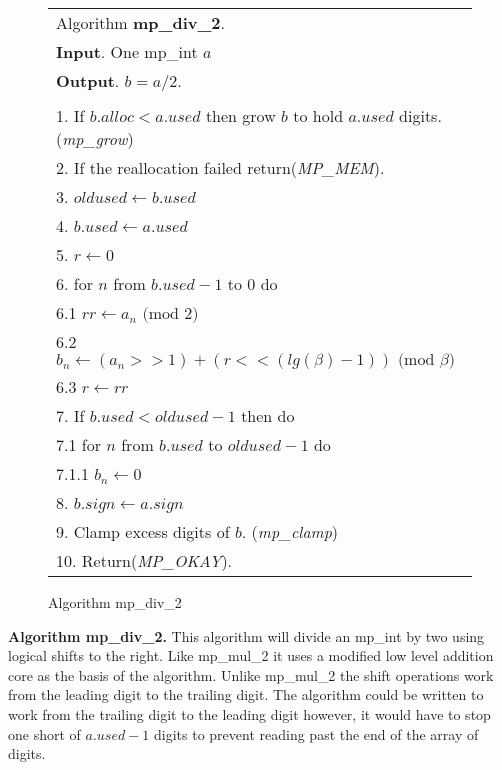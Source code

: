 \documentclass[b5paper]{book}
\begin{document}
\newpage\begin{figure}[!here]
\begin{small}
\begin{center}
\begin{tabular}{l}
\hline Algorithm \textbf{mp\_div\_2}. \\
\textbf{Input}.   One mp\_int $a$ \\
\textbf{Output}.  $b = a/2$. \\
\hline \\
1.  If $b.alloc < a.used$ then grow $b$ to hold $a.used$ digits.  (\textit{mp\_grow}) \\
2.  If the reallocation failed return(\textit{MP\_MEM}). \\
3.  $oldused \leftarrow b.used$ \\
4.  $b.used \leftarrow a.used$ \\
5.  $r \leftarrow 0$ \\
6.  for $n$ from $b.used - 1$ to $0$ do \\
\hspace{3mm}6.1  $rr \leftarrow a_n \mbox{ (mod }2\mbox{)}$\\
\hspace{3mm}6.2  $b_n \leftarrow (a_n >> 1) + (r << (lg(\beta) - 1)) \mbox{ (mod }\beta\mbox{)}$ \\
\hspace{3mm}6.3  $r \leftarrow rr$ \\
7.  If $b.used < oldused - 1$ then do \\
\hspace{3mm}7.1  for $n$ from $b.used$ to $oldused - 1$ do \\
\hspace{6mm}7.1.1  $b_n \leftarrow 0$ \\
8.  $b.sign \leftarrow a.sign$ \\
9.  Clamp excess digits of $b$.  (\textit{mp\_clamp}) \\
10.  Return(\textit{MP\_OKAY}).\\
\hline
\end{tabular}
\end{center}
\end{small}
\caption{Algorithm mp\_div\_2}
\end{figure}

\textbf{Algorithm mp\_div\_2.}
This algorithm will divide an mp\_int by two using logical shifts to the right.  Like mp\_mul\_2 it uses a modified low level addition
core as the basis of the algorithm.  Unlike mp\_mul\_2 the shift operations work from the leading digit to the trailing digit.  The algorithm
could be written to work from the trailing digit to the leading digit however, it would have to stop one short of $a.used - 1$ digits to prevent
reading past the end of the array of digits.
\end{document}
